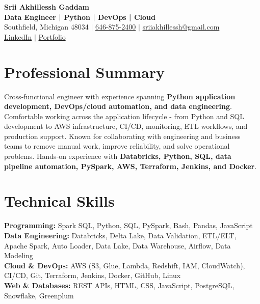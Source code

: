 \documentclass[letterpaper,10pt]{article}
\begin{document}
\fontsize{9.35pt}{10.45pt}\selectfont

\begin{center}
    {\LARGE \textbf{Srii Akhillessh Gaddam}} \\[-1pt]
    \textbf{Data Engineer | Python | DevOps | Cloud} \\[2pt]
    Southfield, Michigan 48034 $|$
    \href{tel:6468752400}{646-875-2400} $|$
    \href{mailto:sriiakhillessh@gmail.com}{sriiakhillessh@gmail.com} \\[1pt]
    \href{https://www.linkedin.com/in/srii-akhiilessh-gaddam-b48668191/}{LinkedIn} $|$
    \href{https://sriiakhillesshg.github.io/portfolio/}{Portfolio}
\end{center}
\vspace{-8pt}

\section{Professional Summary}
\small{Cross-functional engineer with experience spanning \textbf{Python application development, DevOps/cloud automation, and data engineering}. Comfortable working across the application lifecycle - from Python and SQL development to AWS infrastructure, CI/CD, monitoring, ETL workflows, and production support. Known for collaborating with engineering and business teams to remove manual work, improve reliability, and solve operational problems. Hands-on experience with \textbf{Databricks, Python, SQL, data pipeline automation, PySpark, AWS, Terraform, Jenkins, and Docker}.}

\section{Technical Skills}
\small{
\textbf{Programming:} Spark SQL, Python, SQL, PySpark, Bash, Pandas, JavaScript \\
\textbf{Data Engineering:} Databricks, Delta Lake, Data Validation, ETL/ELT, Apache Spark, Auto Loader, Data Lake, Data Warehouse, Airflow, Data Modeling \\
\textbf{Cloud \& DevOps:} AWS (S3, Glue, Lambda, Redshift, IAM, CloudWatch), CI/CD, Git, Terraform, Jenkins, Docker, GitHub, Linux \\
\textbf{Web \& Databases:} REST APIs, HTML, CSS, JavaScript, PostgreSQL, Snowflake, Greenplum
}
\end{document}
